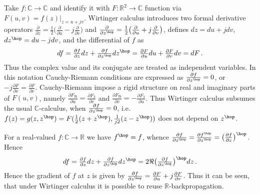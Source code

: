 \documentclass[a4paper,10pt]{article}
\newcommand{\real}{\mathbb{R}}
\newcommand{\cplx}{\mathbb{C}}
\begin{document}
Take $f\colon \cplx \to \cplx$ and identify it with $F\colon \real^2 \to \cplx$ function
via $F(u, v) = f(z)\vert_{z=u + j v}$. Wirtinger calculus introduces two formal derivative
operators
$
  \tfrac\partial{\partial z}
    = \tfrac12 \bigl(
      \tfrac\partial{\partial u}
      - j \tfrac\partial{\partial v}
    \bigr)
$ and $
  \tfrac\partial{\partial z^\hop}
    = \tfrac12 \bigl(
      \tfrac\partial{\partial u}
      + j \tfrac\partial{\partial v}
    \bigr)
$, defines $dz = du + j dv$, $dz^\hop = du - j dv$, and the differential of $f$ as
$$
df = \tfrac{\partial f}{\partial z} dz
    + \tfrac{\partial f}{\partial z^\hop} dz^\hop
   = \tfrac{\partial F}{\partial u} du
     + \tfrac{\partial F}{\partial v} dv
   = dF
  \,. $$
Thus the complex value and its conjugate are treated as independent variables. In this notation
Cauchy-Riemann conditions are expressed as $
  \tfrac{\partial f}{\partial z^\hop} = 0
$, or $
  -j\tfrac{\partial F}{\partial v} = \tfrac{\partial F}{\partial v}
$. Cauchy-Riemann impose a rigid structure on real and imaginary parts of $F(u, v)$, namely $
  \tfrac{\partial F_{\Re }}{\partial u} = \tfrac{\partial F_{\Im }}{\partial v}
$ and $
  \tfrac{\partial F_{\Re }}{\partial v} = - \tfrac{\partial F_{\Im }}{\partial u}
$. Thus Wirtinger calculus subsumes the usual $\cplx$-calculus, when $
  \tfrac{\partial f}{\partial z^\hop} = 0
$, i.e. $
  f(z) = g(z, z^\hop) = F(\tfrac12 (z + z^\hop), \tfrac1{j 2} (z - z^\hop))
$ does not depend on $z^\hop$.

For a real-valued $f\colon \cplx \to \real$ we have $f^\hop = f$, whence $
  \tfrac{\partial f}{\partial z^\hop}
    = \tfrac{\partial f^\hop}{\partial z^\hop}
    = \bigl(\tfrac{\partial f}{\partial z} \bigr)^\hop
$. Hence
$$
df
  = \tfrac{\partial f}{\partial z} dz
    + \tfrac{\partial f}{\partial z^\hop} dz^\hop
  = 2 \Re \bigl( \tfrac{\partial f}{\partial z^\hop} \bigr)^\hop dz
  \,. $$
Hence the gradient of $f$ at $z$ is given by $
  \tfrac{\partial f}{\partial z^\hop}
    = \tfrac{\partial F}{\partial u}
      + j \tfrac{\partial F}{\partial v}
$. Thus it can be seen, that under Wirtinger calculus it is possible to reuse $\real$-backpropagation.
\end{document}
